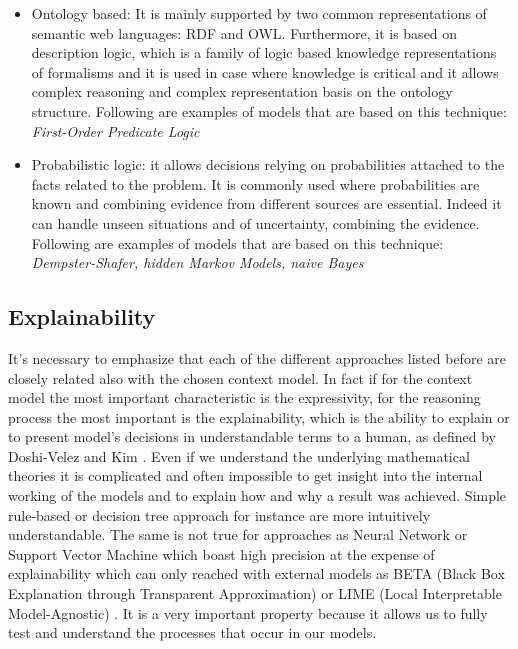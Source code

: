 \documentclass{thesisreport}
\begin{document}
\begin{itemize}
     \item Ontology based: It is mainly supported by two common representations of semantic web languages: RDF and OWL. Furthermore, it is based on description logic, which is a family of logic based knowledge representations of formalisms and it is used in case where knowledge is critical and it allows complex reasoning and complex representation basis on the ontology structure. Following are examples of models that are based on this technique:\\ \textit{First-Order Predicate Logic}
     
     \item Probabilistic logic: it allows decisions relying on probabilities attached to the facts related to the problem. It is commonly used where probabilities are known and combining evidence from different sources are essential. Indeed it can handle unseen situations and of uncertainty, combining the evidence. Following are examples of models that are based on this technique:\\ \textit{Dempster-Shafer, hidden Markov Models, naive Bayes}
 \end{itemize}

\subsection{Explainability}
It's necessary to emphasize that each of the different approaches listed before are closely related also with the chosen context model. In fact if for the context model the most important characteristic is the expressivity, for the reasoning process the most important is the explainability, which is the ability to explain or to present model's decisions in understandable terms to a human, as defined by Doshi-Velez and Kim \cite{doshi2017towards}.
Even if we understand the underlying mathematical theories it is complicated and often impossible to get insight into the internal working of the models and to explain how and why a result was achieved.
Simple rule-based or decision tree approach for instance are more intuitively understandable. The same is not true for approaches as Neural Network or Support Vector Machine which boast high precision at the expense of explainability which can only reached with external models as BETA (Black Box Explanation through Transparent Approximation) \cite{lakkaraju2017interpretable} or LIME (Local Interpretable Model-Agnostic) \cite{ribeiro2016should}.  
It is a very important property because it allows us to fully test and understand the processes that occur in our models.
\end{document}
